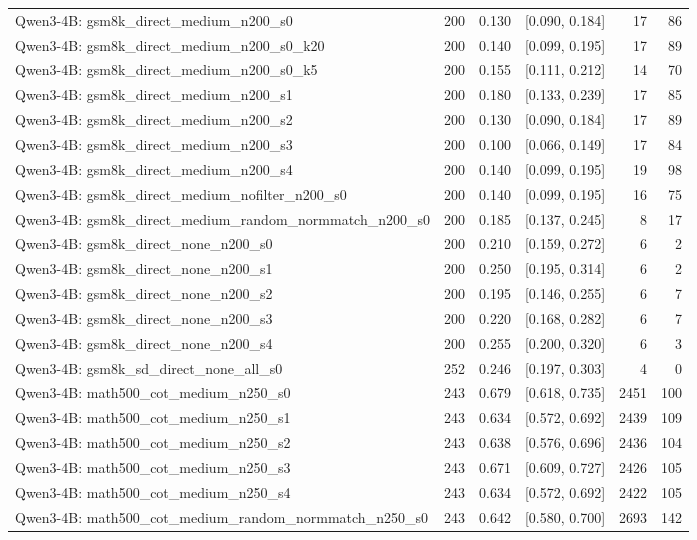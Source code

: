 \begin{tabular}{lrrrrr}
Qwen3-4B: gsm8k\_direct\_medium\_n200\_s0 & 200 & 0.130 & [0.090, 0.184] & 17 & 86 \\
Qwen3-4B: gsm8k\_direct\_medium\_n200\_s0\_k20 & 200 & 0.140 & [0.099, 0.195] & 17 & 89 \\
Qwen3-4B: gsm8k\_direct\_medium\_n200\_s0\_k5 & 200 & 0.155 & [0.111, 0.212] & 14 & 70 \\
Qwen3-4B: gsm8k\_direct\_medium\_n200\_s1 & 200 & 0.180 & [0.133, 0.239] & 17 & 85 \\
Qwen3-4B: gsm8k\_direct\_medium\_n200\_s2 & 200 & 0.130 & [0.090, 0.184] & 17 & 89 \\
Qwen3-4B: gsm8k\_direct\_medium\_n200\_s3 & 200 & 0.100 & [0.066, 0.149] & 17 & 84 \\
Qwen3-4B: gsm8k\_direct\_medium\_n200\_s4 & 200 & 0.140 & [0.099, 0.195] & 19 & 98 \\
Qwen3-4B: gsm8k\_direct\_medium\_nofilter\_n200\_s0 & 200 & 0.140 & [0.099, 0.195] & 16 & 75 \\
Qwen3-4B: gsm8k\_direct\_medium\_random\_normmatch\_n200\_s0 & 200 & 0.185 & [0.137, 0.245] & 8 & 17 \\
Qwen3-4B: gsm8k\_direct\_none\_n200\_s0 & 200 & 0.210 & [0.159, 0.272] & 6 & 2 \\
Qwen3-4B: gsm8k\_direct\_none\_n200\_s1 & 200 & 0.250 & [0.195, 0.314] & 6 & 2 \\
Qwen3-4B: gsm8k\_direct\_none\_n200\_s2 & 200 & 0.195 & [0.146, 0.255] & 6 & 7 \\
Qwen3-4B: gsm8k\_direct\_none\_n200\_s3 & 200 & 0.220 & [0.168, 0.282] & 6 & 7 \\
Qwen3-4B: gsm8k\_direct\_none\_n200\_s4 & 200 & 0.255 & [0.200, 0.320] & 6 & 3 \\
Qwen3-4B: gsm8k\_sd\_direct\_none\_all\_s0 & 252 & 0.246 & [0.197, 0.303] & 4 & 0 \\
Qwen3-4B: math500\_cot\_medium\_n250\_s0 & 243 & 0.679 & [0.618, 0.735] & 2451 & 100 \\
Qwen3-4B: math500\_cot\_medium\_n250\_s1 & 243 & 0.634 & [0.572, 0.692] & 2439 & 109 \\
Qwen3-4B: math500\_cot\_medium\_n250\_s2 & 243 & 0.638 & [0.576, 0.696] & 2436 & 104 \\
Qwen3-4B: math500\_cot\_medium\_n250\_s3 & 243 & 0.671 & [0.609, 0.727] & 2426 & 105 \\
Qwen3-4B: math500\_cot\_medium\_n250\_s4 & 243 & 0.634 & [0.572, 0.692] & 2422 & 105 \\
Qwen3-4B: math500\_cot\_medium\_random\_normmatch\_n250\_s0 & 243 & 0.642 & [0.580, 0.700] & 2693 & 142 \\

\end{tabular}
